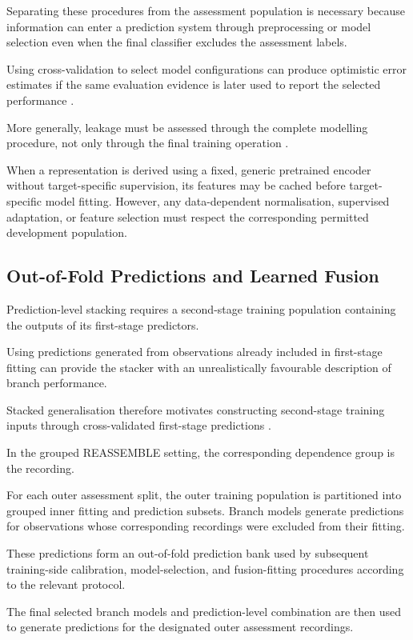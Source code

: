 Separating these procedures from the assessment population is necessary because information can enter a prediction system through preprocessing or model selection even when the final classifier excludes the assessment labels.

Using cross-validation to select model configurations can produce optimistic error estimates if the same evaluation evidence is later used to report the selected performance \parencite{P004}.

More generally, leakage must be assessed through the complete modelling procedure, not only through the final training operation \parencite{P017}.

When a representation is derived using a fixed, generic pretrained encoder without target-specific supervision, its features may be cached before target-specific model fitting. However, any data-dependent normalisation, supervised adaptation, or feature selection must respect the corresponding permitted development population.

\subsection{Out-of-Fold Predictions and Learned Fusion}

Prediction-level stacking requires a second-stage training population containing the outputs of its first-stage predictors.

Using predictions generated from observations already included in first-stage fitting can provide the stacker with an unrealistically favourable description of branch performance.

Stacked generalisation therefore motivates constructing second-stage training inputs through cross-validated first-stage predictions \parencite{Ting1999Issues}.

In the grouped REASSEMBLE setting, the corresponding dependence group is the recording.

For each outer assessment split, the outer training population is partitioned into grouped inner fitting and prediction subsets. Branch models generate predictions for observations whose corresponding recordings were excluded from their fitting.

These predictions form an out-of-fold prediction bank used by subsequent training-side calibration, model-selection, and fusion-fitting procedures according to the relevant protocol.

The final selected branch models and prediction-level combination are then used to generate predictions for the designated outer assessment recordings.

